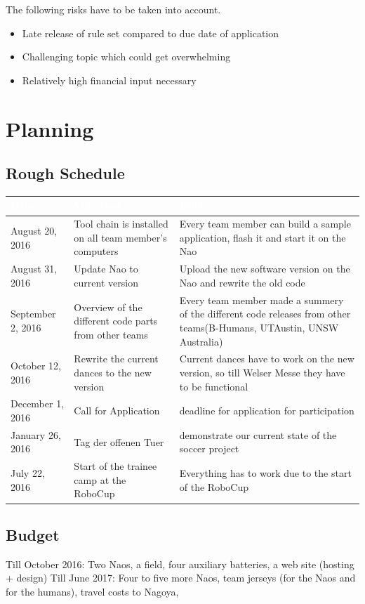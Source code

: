 \documentclass[12pt]{article}
\theoremstyle{definition}
\begin{document}
The following risks have to be taken into account.
\begin{itemize}
\item Late release of rule set compared to due date of application
\item Challenging topic which could get overwhelming
\item Relatively high financial input necessary
\end{itemize}

\section{Planning}
\subsection{Rough Schedule}

\begin{tabular}{|p{}|p{}|p{}|}
\hline
\cellcolor[gray]{0.5}\textcolor{white}{Date} & \cellcolor[gray]{0.45}\textcolor{white}{Milestone} & \cellcolor[gray]{0.5}\textcolor{white}{DoD} \\ \hline
August 20, 2016 & Tool chain is installed on all team member's computers & Every team member can build a sample application, flash it and start it on the Nao \\ \hline
August 31, 2016 & Update Nao to current version & Upload the new software version on the Nao and rewrite the old code \\ \hline
September 2, 2016 & Overview of the different code parts from other teams & Every team member made a summery of the different code releases from other teams(B-Humans, UTAustin, UNSW Australia) \\ \hline
October 12, 2016 & Rewrite the current dances to the new version & Current dances have to work on the new version, so till Welser Messe they have to be functional \\ \hline
December 1, 2016 & Call for Application & deadline for application for participation \\ \hline
January 26, 2016 & Tag der offenen Tuer & demonstrate our current state of the soccer project \\ \hline
July 22, 2016 & Start of the trainee camp at the RoboCup & Everything has to work due to the start of the RoboCup\\ \hline
\end{tabular}


\subsection{Budget}
Till October 2016: Two Naos, a field, four auxiliary batteries, a web site (hosting + design)
Till June 2017: Four to five more Naos, team jerseys (for the Naos and for the humans), travel costs to Nagoya, 

{}
\end{document}
